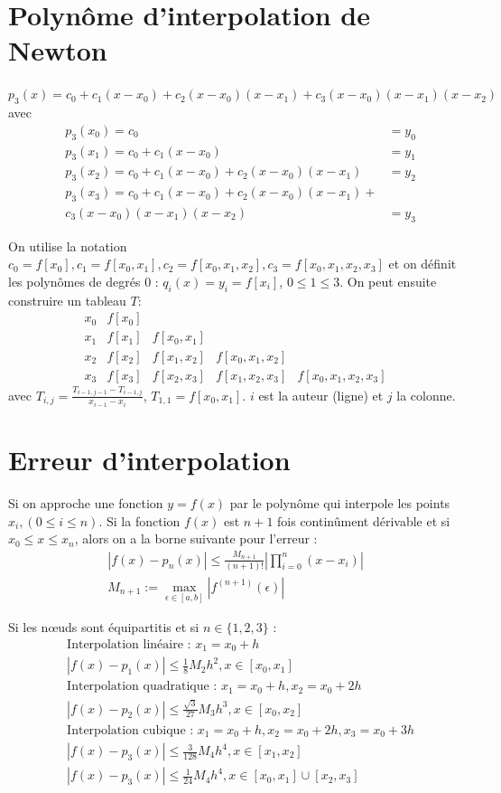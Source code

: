 \documentclass[a4paper,9pt]{extarticle}
\begin{document}
\begin{multicols*}{2}
\section{Polynôme d'interpolation de Newton}

$p_3(x)=c_0+c_1(x-x_0)+c_2(x-x_0)(x-x_1)+c_3(x-x_0)(x-x_1)(x-x_2)$ avec
\begin{align*}
&p_3(x_0)=c_0 &=y_0\\
&p_3(x_1)=c_0+c_1(x-x_0) &=y_1\\
&p_3(x_2)=c_0+c_1(x-x_0)+c_2(x-x_0)(x-x_1) &=y_2\\
&p_3(x_3)=c_0+c_1(x-x_0)+c_2(x-x_0)(x-x_1)+\\&c_3(x-x_0)(x-x_1)(x-x_2) &=y_3
\end{align*}

On utilise la notation $c_0=f[x_0],c_1=f[x_0,x_1],c_2=f[x_0,x_1,x_2],c_3=f[x_0,x_1,x_2,x_3]$ et on définit les polynômes de degrés $0$ : $q_i(x)=y_i=f[x_i]$, $0\leq 1\leq 3$. On peut ensuite construire un tableau $T$:
$$
\begin{array}{c|cccc}
x_0 & f[x_0]\\
x_1 & f[x_1] & f[x_0,x_1]\\
x_2 & f[x_2] & f[x_1,x_2] & f[x_0,x_1,x_2]\\
x_3 & f[x_3] & f[x_2,x_3] & f[x_1,x_2,x_3] & f[x_0,x_1,x_2,x_3]
\end{array}
$$
avec $T_{i,j} = \frac{T_{i-1,j-1}-T_{i-1,j}}{x_{i-1}-x_{i}}$, \textbf{$T_{1,1}=f[x_0,x_1]$}. $i$ est la auteur (ligne) et $j$ la colonne.

\section{Erreur d'interpolation}

Si on approche une fonction $y=f(x)$ par le polynôme qui interpole les points $x_i,(0 \leq i \leq n)$. Si la fonction $f(x)$ est $n+1$ fois continûment dérivable et si $x_0 \leq x \leq x_n$, alors on a la borne suivante pour l'erreur : 
\begin{align*}
|f(x)-p_n(x)|\leq\frac{M_{n+1}}{(n+1)!}|\prod^n_{i=0}(x-x_i)|\\
M_{n+1} := \max_{\epsilon\in[a,b]}|f^{(n+1)}(\epsilon)|
\end{align*}

Si les nœuds sont équipartitis et si $n\in\{1,2,3\}$ :
\begin{align*}
&\text{Interpolation linéaire : }x_1=x_0+h \\
&|f(x)-p_1(x)|\leq \frac{1}{8}M_2h^2,x\in [x_0,x_1] \\
&\text{Interpolation quadratique : }x_1=x_0+h,x_2=x_0+2h \\
&|f(x)-p_2(x)|\leq \frac{\sqrt{3}}{27}M_3h^3,x\in [x_0,x_2]\\
&\text{Interpolation cubique : }x_1=x_0+h,x_2=x_0+2h,x_3=x_0+3h \\
&|f(x)-p_3(x)|\leq \frac{3}{128}M_4h^4,x\in[x_1,x_2]\\
&|f(x)-p_3(x)|\leq \frac{1}{24}M_4h^4,x\in[x_0,x_1]\cup[x_2,x_3]\\
\end{align*}


\end{multicols*}
\end{document}
